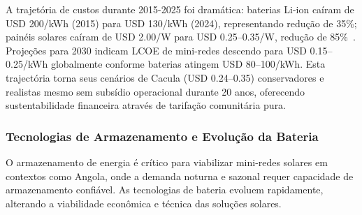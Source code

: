 \documentclass[12pt, a4paper]{article}
\begin{document}
A trajetória de custos durante 2015-2025 foi dramática: baterias Li-ion caíram de USD 200/kWh (2015) para USD 130/kWh (2024), representando redução de 35\%; painéis solares caíram de USD 2.00/W para USD 0.25--0.35/W, redução de 85\%~\citep{Schmidt2021}. Projeções para 2030 indicam LCOE de mini-redes descendo para USD 0.15--0.25/kWh globalmente conforme baterias atingem USD 80--100/kWh. Esta trajectória torna seus cenários de Cacula (USD 0.24--0.35) conservadores e realistas mesmo sem subsídio operacional durante 20 anos, oferecendo sustentabilidade financeira através de tarifação comunitária pura.

\subsubsection{Tecnologias de Armazenamento e Evolução da Bateria}

O armazenamento de energia é crítico para viabilizar mini-redes solares em contextos como Angola, onde a demanda noturna e sazonal requer capacidade de armazenamento confiável. As tecnologias de bateria evoluem rapidamente, alterando a viabilidade econômica e técnica das soluções solares.
\end{document}
